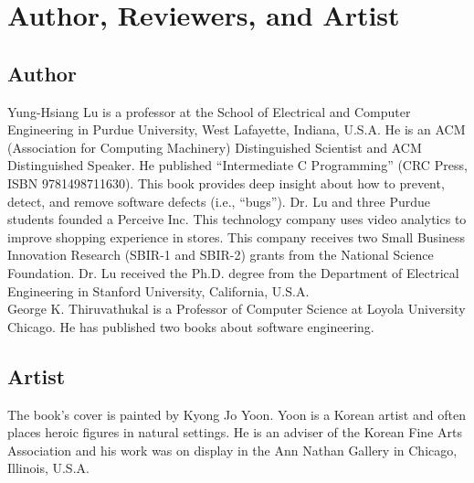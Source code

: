 \chapter*{Author, Reviewers, and Artist}

\section*{Author}

 Yung-Hsiang Lu is a
professor at the School of Electrical and Computer Engineering in
Purdue University, West Lafayette, Indiana, U.S.A.  He is an ACM
(Association for Computing Machinery) Distinguished Scientist and ACM
Distinguished Speaker. He published ``Intermediate C Programming''
(CRC Press, ISBN 9781498711630).  This book provides deep insight
about how to prevent, detect, and remove software defects (i.e.,
``bugs'').  Dr. Lu and three Purdue students founded a Perceive
Inc. This technology company uses video analytics to improve shopping
experience in stores. This company receives two Small Business
Innovation Research (SBIR-1 and SBIR-2) grants from the National
Science Foundation.  Dr. Lu received the Ph.D. degree from the
Department of Electrical Engineering in Stanford University,
California, U.S.A.  \\

George K. Thiruvathukal is a Professor of Computer Science at Loyola
University Chicago.  He has published two books about software
engineering.


\section*{Artist}


The book's cover is painted by Kyong Jo Yoon.  Yoon is a Korean artist
and often places heroic figures in natural settings.  He is an adviser
of the Korean Fine Arts Association and his work was on display in the
Ann Nathan Gallery in Chicago, Illinois, U.S.A.


